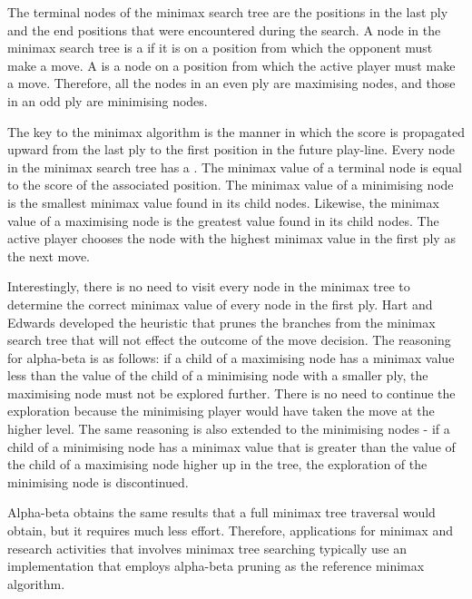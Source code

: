 The terminal nodes of the minimax search tree are the positions in the last ply and the end positions that were encountered during the search. A node in the minimax search tree is a  if it is on a position from which the opponent must make a move.  A  is a node on a position from which the active player must make a move.  Therefore, all the nodes in an even ply are maximising nodes, and those in an odd ply are minimising nodes.    

The key to the minimax algorithm is the manner in which the score is propagated upward from the last ply to the first position in the future play-line. Every node in the minimax search tree has a . The minimax value of a terminal node is equal to the score of the associated position.  The minimax value of a minimising node is the smallest minimax value found in its child nodes.  Likewise, the minimax value of a maximising node is the greatest value found in its child nodes.  The active player chooses the node with the highest minimax value in the first ply as the next move.

Interestingly, there is no need to visit every node in the minimax tree to determine the correct minimax value of every node in the first ply.  Hart and Edwards \cite{hart:alpha} developed the  heuristic that prunes the branches from the minimax search tree that will not effect the outcome of the move decision.  The reasoning for alpha-beta is as follows: if a child of a maximising node has a minimax value less than the value of the child of a minimising node with a smaller ply, the maximising node must not be explored further.  There is no need to continue the exploration because the minimising player would have taken the move at the higher level.  The same reasoning is also extended to the minimising nodes - if a child of a minimising node has a minimax value that is greater than the value of the child of a maximising node higher up in the tree, the exploration of the minimising node is discontinued.     

Alpha-beta obtains the same results that a full minimax tree traversal would obtain, but it requires much less effort. Therefore, applications for minimax and research activities that involves minimax tree searching typically use an implementation that employs alpha-beta pruning as the reference minimax algorithm.        

